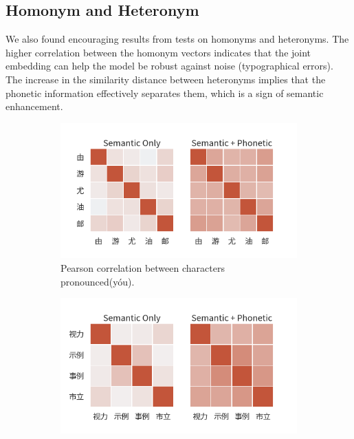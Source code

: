 \subsection{Homonym and Heteronym} \label{sec:analysis_homonym_heteronym}

We also found encouraging results from tests on homonyms and heteronyms. The higher correlation between the homonym vectors indicates that the joint embedding can help the model be robust against noise (typographical errors).  The increase in the similarity distance between heteronyms implies that the phonetic information effectively separates them, which is a sign of semantic enhancement.

\begin{figure}[t]
    \centering
    \begin{subfigure}[b]{0.49\textwidth}
        \centering
        \includegraphics[width=\textwidth]{../images/corr_zh1.png}
        \caption{Pearson correlation between characters pronounced (yóu).}
        \label{fig:corr_zh1}
    \end{subfigure}
    \hfill
    \begin{subfigure}[b]{0.49\textwidth}
        \centering
        \includegraphics[width=\textwidth]{../images/corr_zh2.png}

\end{subfigure}
\end{figure}
